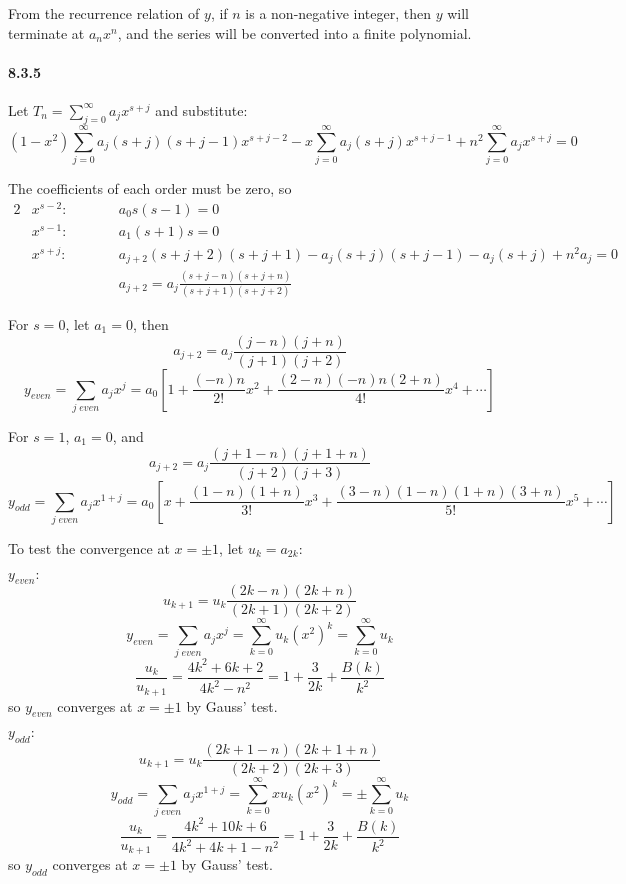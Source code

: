\documentclass[a4paper]{article}
\begin{document}
From the recurrence relation of $y$, if $n$ is a non-negative integer, then $y$ will terminate at $a_{n}x^{n}$, and the series will be converted into a finite polynomial.

\paragraph{8.3.5}
Let $T_n=\sum_{j=0}^\infty a_jx^{s+j}$ and substitute:
\[
(1-x^2)\sum_{j=0}^\infty a_j(s+j)(s+j-1)x^{s+j-2}-x\sum_{j=0}^\infty a_j(s+j)x^{s+j-1}+n^2\sum_{j=0}^\infty a_jx^{s+j}=0
\]

The coefficients of each order must be zero, so
\begin{alignat*}{2}
    & x^{s-2}:\qquad && a_0s(s-1)=0\\
    & x^{s-1}:\qquad && a_1(s+1)s=0\\
    & x^{s+j}:\qquad && a_{j+2}(s+j+2)(s+j+1)-a_j(s+j)(s+j-1)-a_j(s+j)+n^2a_j=0\\
    & && a_{j+2}=a_j\frac{(s+j-n)(s+j+n)}{(s+j+1)(s+j+2)}
\end{alignat*}

For $s=0$, let $a_1=0$, then
\[
a_{j+2}=a_j\frac{(j-n)(j+n)}{(j+1)(j+2)}
\]
\[
y_{even}=\sum_{j\;even}a_jx^j=a_0\left[1+\frac{(-n)n}{2!}x^2+\frac{(2-n)(-n)n(2+n)}{4!}x^4+\cdots \right]
\]

For $s=1$, $a_1=0$, and
\[
a_{j+2}=a_j\frac{(j+1-n)(j+1+n)}{(j+2)(j+3)}
\]
\[
y_{odd}=\sum_{j\;even}a_jx^{1+j}=a_0\left[x+\frac{(1-n)(1+n)}{3!}x^3+\frac{(3-n)(1-n)(1+n)(3+n)}{5!}x^5+\cdots \right]
\]
\medskip

To test the convergence at $x=\pm1$, let $u_k=a_{2k}$:

$y_{even}:$
\[
u_{k+1}=u_k\frac{(2k-n)(2k+n)}{(2k+1)(2k+2)}
\]
\[
y_{even}=\sum_{j\;even}a_jx^j=\sum_{k=0}^\infty u_k(x^2)^k=\sum_{k=0}^\infty u_k
\]
\[
\frac{u_k}{u_{k+1}}=\frac{4k^2+6k+2}{4k^2-n^2}=1+\frac{3}{2k}+\frac{B(k)}{k^2}
\]
so $y_{even}$ converges at $x=\pm1$ by Gauss' test.
\medskip

$y_{odd}:$
\[
u_{k+1}=u_k\frac{(2k+1-n)(2k+1+n)}{(2k+2)(2k+3)}
\]
\[
y_{odd}=\sum_{j\;even}a_jx^{1+j}=\sum_{k=0}^\infty xu_k(x^2)^k=\pm\sum_{k=0}^\infty u_k
\]
\[
\frac{u_k}{u_{k+1}}=\frac{4k^2+10k+6}{4k^2+4k+1-n^2}=1+\frac{3}{2k}+\frac{B(k)}{k^2}
\]
so $y_{odd}$ converges at $x=\pm1$ by Gauss' test.
\end{document}

